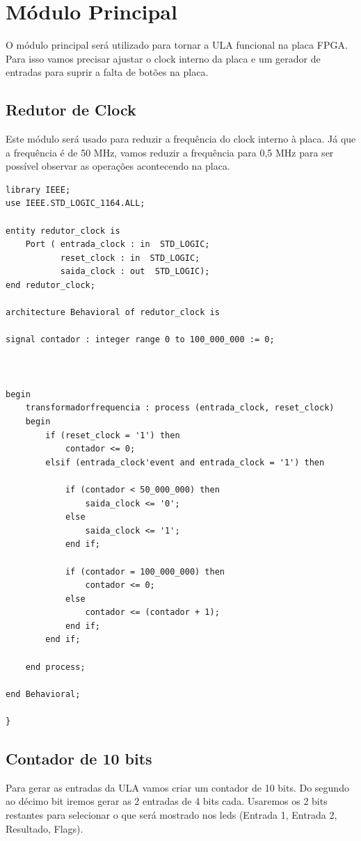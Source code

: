 \documentclass[a4paper,12pt,twoside]{article}
\begin{document}
\section{Módulo Principal}
O módulo principal será utilizado para tornar a ULA funcional na placa FPGA. Para isso vamos precisar ajustar o clock interno da placa e um gerador de entradas para suprir a falta de botões na placa.

\subsection{Redutor de Clock}
    Este módulo será usado para reduzir a frequência do clock interno à placa.
    Já que a frequência é de 50 MHz, vamos reduzir a frequência para 0,5 MHz para ser possível observar as operações acontecendo na placa. 
    
\begin{lstlisting}
library IEEE;
use IEEE.STD_LOGIC_1164.ALL;

entity redutor_clock is
    Port ( entrada_clock : in  STD_LOGIC;
           reset_clock : in  STD_LOGIC;
           saida_clock : out  STD_LOGIC);
end redutor_clock;

architecture Behavioral of redutor_clock is

signal contador : integer range 0 to 100_000_000 := 0;

  

begin
	transformadorfrequencia : process (entrada_clock, reset_clock)
	begin 
		if (reset_clock = '1') then
			contador <= 0;	
		elsif (entrada_clock'event and entrada_clock = '1') then
		
			if (contador < 50_000_000) then
				saida_clock <= '0';
			else
				saida_clock <= '1';
			end if;
					
			if (contador = 100_000_000) then
				contador <= 0;
			else
				contador <= (contador + 1);
			end if;
		end if;
			
	end process; 
		
end Behavioral;

} \end{lstlisting}
\subsection{Contador de 10 bits}
    Para gerar as entradas da ULA vamos criar um contador de 10 bits. Do segundo ao décimo bit iremos gerar as 2 entradas de 4 bits cada. Usaremos os 2 bits restantes para selecionar o que será mostrado nos leds (Entrada 1, Entrada 2, Resultado, Flags).
\end{document}
